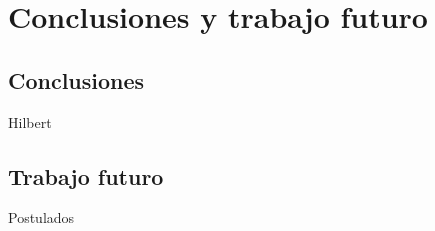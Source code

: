 \cleardoublepage

\chapter{Conclusiones y trabajo futuro}
\label{makereference}

\section{Conclusiones}
Hilbert \n

\section{Trabajo futuro}
Postulados \n